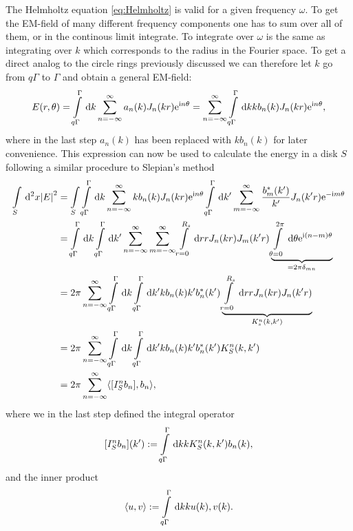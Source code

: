 \documentclass[11pt,a4paper, 
swedish,english %
]{article}
\begin{document}
The Helmholtz equation \eqref{eq:Helmholtz} is valid for a given frequency $\omega$. To get the EM-field of many different frequency components one has to sum over all of them, or in the continous limit integrate. To integrate over $\omega$ is the same as integrating over $k$ which corresponds to the radius in the Fourier space. To get a direct analog to the circle rings previously discussed we can therefore let $k$ go from $q\Gamma$ to $\Gamma$ and obtain a general EM-field:
\begin{equation}
\label{eq:polar_wave_general}
E(r,\theta)=\int_{q\Gamma}^\Gamma \id k \sum_{n=-\infty}^{\infty} a_n(k) J_n(kr)\ee^{\ii n \theta}
=\sum_{n=-\infty}^{\infty} \int_{q\Gamma}^\Gamma \id k kb_n(k) J_n(kr)\ee^{\ii n \theta},
\end{equation}
where in the last step $a_n(k)$ has been replaced with $kb_n(k)$ for later convenience.
This expression can now be used to calculate the energy in a disk $S$ following a similar procedure to Slepian's method
\begin{equation}
  \label{eq:energy_bessel}
\begin{aligned}
\int_S \id^2x \abs{E}^2&= \int_S \int_{q\Gamma}^\Gamma \id k \sum_{n= -\infty}^{\infty} kb_n(k) J_n(kr)\ee^{\ii n \theta} \int_{q\Gamma}^\Gamma \id k' \sum_{m= -\infty}^{\infty} \frac{b_m^*(k')}{k'} J_n(k'r)\ee^{-\ii m \theta}\\
&=\int_{q\Gamma}^\Gamma \id k \int_{q\Gamma}^\Gamma \id k' \sum_{n= -\infty}^{\infty} \sum_{m= -\infty}^{\infty} \int_{r=0}^{R_s} \id r r J_n(kr)J_m(k'r)\underbrace{\int_{\theta=0}^{2\pi} \id \theta \ee^{\ii (n-m) \theta}}_{=2\pi \delta_{mn}}\\
&=2\pi \sum_{n=-\infty}^{\infty} \int_{q\Gamma}^\Gamma \id k \int_{q\Gamma}^\Gamma \id k'  kb_n(k) k'b_n^*(k') \underbrace{\int_{r=0}^{R_s} \id r r J_n(kr) J_n(k'r)}_{K_s^n(k,k')}\\
&=2\pi \sum_{n=-\infty}^{\infty} \int_{q\Gamma}^\Gamma \id k \int_{q\Gamma}^\Gamma \id k'  kb_n(k) k'b_n^*(k') K_S^n(k,k')\\
&=2\pi \sum_{n=-\infty}^{\infty} \langle [I_S^nb_n],b_n \rangle,
\end{aligned}
\end{equation}
where we in the last step defined the integral operator
\begin{equation}
  \label{eq:int_op_bessel}
[I_S^nb_n](k'):=\int_{q\Gamma}^\Gamma \id k k K_S^n(k,k')b_n(k),
\end{equation}
and the inner product
\begin{equation}
  \label{eq:in_prod_bessel}
\langle u,v \rangle := \int_{q\Gamma}^\Gamma \id k k u(k), v(k).
\end{equation}
\end{document}
